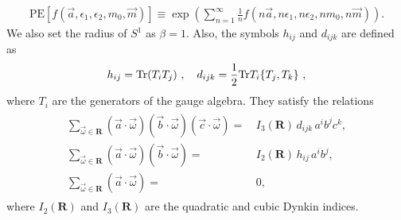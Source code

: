 \documentclass[letterpaper, 11pt]{article}
\def\e{\epsilon}
\def\half{\frac{1}{2}}
\def\Tr{{\rm Tr}}
\begin{document}
\begin{align}
  \label{eq:PE}
  \text{PE}\left[f(\vec{a},\e_1,\e_2, m_0 ,\vec{m})\right] \equiv \exp\left(\sum_{n=1}^\infty\frac{1}{n} f(n\vec{a},n\e_1,n\e_2,n m_0,n\vec{m})\right).
\end{align}
We also set the radius of ${S}^1$ as $\beta = 1$. Also, the symbols $h_{ij}$ and $d_{ijk}$ are defined as 
\begin{align}
 h_{ij} = \Tr (T_i T_j ) \ , \quad
 d_{ijk} = \half \Tr T_i \{T_j,  T_k\} \ , 
\end{align}
where $T_i$ are the generators of the gauge algebra. 
They satisfy the relations
\begin{align}
\begin{split}
   \sum_{\vec{\omega}\in\boldsymbol{R}}(\vec{a}\cdot\vec{\omega})(\vec{b}\cdot\vec{\omega})(\vec{c}\cdot\vec{\omega})=&\,I_3(\boldsymbol{R})\,d_{ijk}\,a^ib^jc^k, \\
   \sum_{\vec{\omega}\in\boldsymbol{R}}(\vec{a}\cdot\vec{\omega})(\vec{b}\cdot\vec{\omega})=&\,I_2(\boldsymbol{R})\,h_{ij}\,a^ib^j,\\
   \sum_{\vec{\omega}\in\boldsymbol{R}}(\vec{a}\cdot\vec{\omega})=&\,0 , 
\end{split}
\end{align}
where $I_2(\mathbf{R})$ and $I_3(\mathbf{R})$ are the quadratic and cubic Dynkin indices. 
\end{document}
